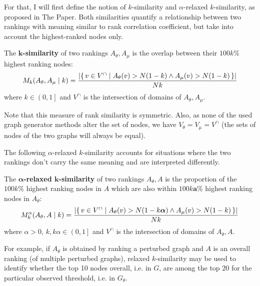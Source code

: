 For that, I will first define the notion of $k$-similarity and $\alpha$-relaxed $k$-similarity, as proposed in The Paper.
Both similarities quantify a relationship between two rankings with meaning similar to rank correlation coefficient, but take into account the highest-ranked nodes only.

\begin{definition}[$\bm{k}$-similarity]
    \label{def:k_similarity}
    The \textbf{$\bm{k}$-similarity} of two rankings $A_\theta, A_\mu$ is the overlap between their $100k\%$ highest ranking nodes:
    \[ M_k(A_\theta, A_\mu \mid k) = \frac{\left\lvert \left\{\, v \in V^{\cap} \mid  A_\theta(v) > N(1-k) \wedge A_\mu(v) > N(1-k)  \, \right\} \right\rvert}{Nk} \]
    where $k \in \left( 0, 1 \right]$ and $V^{\cap}$ is the intersection of domains of $A_\theta, A_\mu$.
\end{definition}

Note that this measure of rank similarity is symmetric.
Also, as none of the used graph generator methods alter the set of nodes, we have $V_\theta = V_\mu = V^{\cap}$ (the sets of nodes of the two graphs will always be equal).

The following $\alpha$-relaxed $k$-similarity accounts for situations where the two rankings don't carry the same meaning and are interpreted differently.

\begin{definition}
    \label{def:alpha_relaxed_k_similarity}
    The \textbf{$\bm{\alpha}$-relaxed $\bm{k}$-similarity} of two rankings $A_\theta, A$ is the proportion of the $100k\%$ highest ranking nodes in $A$ which are also within $100k\bm{a}\%$ highest ranking nodes in $A_\theta$:
    \[ M_k^\alpha(A_\theta, A \mid k) = \frac{\left\lvert \left\{\, v \in V^{\cap} \mid  A_\theta(v) > N(1-k\bm{\alpha}) \wedge A_\mu(v) > N(1-k)  \, \right\} \right\rvert}{Nk} \]
    where $\alpha > 0$, $k, k\alpha \in \left( 0, 1 \right]$ and $V^{\cap}$ is the intersection of domains of $A_\theta, A$.
\end{definition}

For example, if $A_\theta$ is obtained by ranking a perturbed graph and $A$ is an overall ranking (of multiple perturbed graphs), relaxed $k$-similarity may be used to identify whether the top 10 nodes overall, i.e. in $G$, are among the top 20 for the particular observed threshold, i.e. in $G_\theta$.



